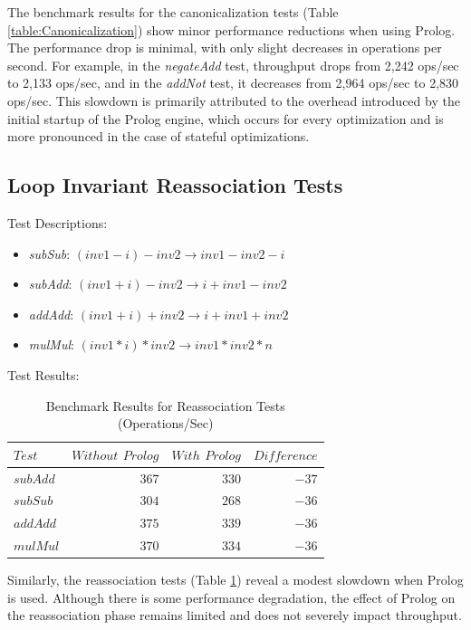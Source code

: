 \vspace{-10pt}

The benchmark results for the canonicalization tests (Table \ref{table:Canonicalization}) show minor performance reductions when using Prolog. The performance drop is minimal, with only slight decreases in operations per second. For example, in the \textit{negateAdd} test, throughput drops from 2,242 ops/sec to 2,133 ops/sec, and in the \textit{addNot} test, it decreases from 2,964 ops/sec to 2,830 ops/sec.
This slowdown is primarily attributed to the overhead introduced by the initial startup of the Prolog engine, which occurs for every optimization and is more pronounced in the case of stateful optimizations.

\subsection*{Loop Invariant Reassociation Tests}
Test Descriptions:
\begin{itemize}
    \item \textit{subSub}: $(inv1 - i) - inv2 \rightarrow inv1 - inv2 - i$
    \item \textit{subAdd}: $(inv1 + i) - inv2 \rightarrow i + inv1 - inv2$
    \item \textit{addAdd}: $(inv1 + i) + inv2 \rightarrow i + inv1 + inv2$
    \item \textit{mulMul}: $(inv1 * i) * inv2 \rightarrow inv1 * inv2 * n$
\end{itemize}

Test Results:
\begin{table}[h]
    \centering
    \begin{tabular}{|l|r|r|r|}
        \hline
        $Test$ & $Without$ $Prolog$ & $With$ $Prolog$ & $Difference$ \\
        \hline
        $subAdd$ & $367$ & $330$ & $-37$ \\
        $subSub$ & $304$ & $268$ & $-36$ \\
        $addAdd$ & $375$ & $339$ & $-36$ \\
        $mulMul$ & $370$ & $334$ & $-36$ \\
        \hline
    \end{tabular}
    \caption{Benchmark Results for Reassociation Tests (Operations/Sec)}
    \label{table:Reassociation}
\end{table}

\vspace{-10pt}

Similarly, the reassociation tests (Table \ref{table:Reassociation}) reveal a modest slowdown when Prolog is used. Although there is some performance degradation, the effect of Prolog on the reassociation phase remains limited and does not severely impact throughput.

